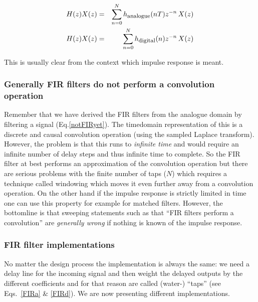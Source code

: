 \documentclass[12pt,a4paper]{article}
\begin{document}
\begin{eqnarray}
H(z)X(z) & = & \sum_{n=0}^N h_\textrm{\footnotesize{analogue}}(nT) z^{-n} \, X(z) \label{FIRa} \\
H(z)X(z) & = & \sum_{n=0}^N h_\textrm{\footnotesize{digital}}(n) z^{-n} \, X(z) \label{FIRd}
\end{eqnarray}

This is usually clear from the context which impulse response is meant.

\subsubsection{Generally FIR filters do not perform a convolution operation}

Remember that we have derived the FIR filters from the analogue domain
by filtering a signal (Eq.\ref{notFIRyet}). The timedomain representation
of this is a discrete and causal convolution operation (using the
sampled Laplace transform). However, the problem is that this runs to
\textsl{infinite time} and would require an infinite number of delay
steps and thus infinite time to complete. So the FIR filter at best
performs an approximation of the convolution operation but there
are serious problems with the finite number of taps ($N$) which
requires a technique called windowing which moves it even further away
from a convolution operation. On the other hand if the impulse
response is strictly limited in time one can use this property for
example for matched filters. However, the bottomline is that sweeping statements
such as that ``FIR filters perform a convolution'' are \textsl{generally wrong}
if nothing is known of the impulse response.



\subsubsection{FIR filter implementations}
No matter the design process the implementation is always the same: we
need a delay line for the incoming signal and then weight the delayed
outputs by the different coefficients and for that reason are called
(water-) ``taps'' (see Eqs.~\ref{FIRa} \& \ref{FIRd}). We are now presenting
different implementations.
\end{document}
